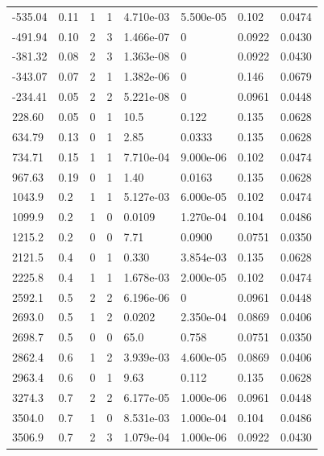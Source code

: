 \documentclass[preview]{standalone}
\begin{document}
{{\begin{tabular}{L{1.2cm}C{1.2cm} C{0.3cm}C{0.5cm} C{1.4cm}C{1.4cm} C{1.4cm}C{1.4cm}}
  -535.04  &  0.11  & 1     &  1 &  4.710e-03  & 5.500e-05  & 0.102 &  0.0474   \\ 
  -491.94  &  0.10  & 2     &  3 &  1.466e-07  & 0  & 0.0922 &  0.0430   \\ 
  -381.32  &  0.08  & 2     &  3 &  1.363e-08  & 0  & 0.0922 &  0.0430   \\ 
  -343.07  &  0.07  & 2     &  1 &  1.382e-06  & 0  & 0.146 &  0.0679   \\ 
  -234.41  &  0.05  & 2     &  2 &  5.221e-08  & 0  & 0.0961 &  0.0448   \\ 
  228.60  &  0.05  & 0     &  1 &  10.5  & 0.122  & 0.135 &  0.0628   \\ 
  634.79  &  0.13  & 0     &  1 &  2.85  & 0.0333  & 0.135 &  0.0628   \\ 
  734.71  &  0.15  & 1     &  1 &  7.710e-04  & 9.000e-06  & 0.102 &  0.0474   \\ 
  967.63  &  0.19  & 0     &  1 &  1.40  & 0.0163  & 0.135 &  0.0628   \\ 
  1043.9  &   0.2  & 1     &  1 &  5.127e-03  & 6.000e-05  & 0.102 &  0.0474   \\ 
  1099.9  &   0.2  & 1     &  0 &  0.0109  & 1.270e-04  & 0.104 &  0.0486   \\ 
  1215.2  &   0.2  & 0     &  0 &  7.71  & 0.0900  & 0.0751 &  0.0350   \\ 
  2121.5  &   0.4  & 0     &  1 &  0.330  & 3.854e-03  & 0.135 &  0.0628   \\ 
  2225.8  &   0.4  & 1     &  1 &  1.678e-03  & 2.000e-05  & 0.102 &  0.0474   \\ 
  2592.1  &   0.5  & 2     &  2 &  6.196e-06  & 0  & 0.0961 &  0.0448   \\ 
  2693.0  &   0.5  & 1     &  2 &  0.0202  & 2.350e-04  & 0.0869 &  0.0406   \\ 
  2698.7  &   0.5  & 0     &  0 &  65.0  & 0.758  & 0.0751 &  0.0350   \\ 
  2862.4  &   0.6  & 1     &  2 &  3.939e-03  & 4.600e-05  & 0.0869 &  0.0406   \\ 
  2963.4  &   0.6  & 0     &  1 &  9.63  & 0.112  & 0.135 &  0.0628   \\ 
  3274.3  &   0.7  & 2     &  2 &  6.177e-05  & 1.000e-06  & 0.0961 &  0.0448   \\ 
  3504.0  &   0.7  & 1     &  0 &  8.531e-03  & 1.000e-04  & 0.104 &  0.0486   \\ 
  3506.9  &   0.7  & 2     &  3 &  1.079e-04  & 1.000e-06  & 0.0922 &  0.0430   \\ 

\end{tabular}}}
\end{document}
